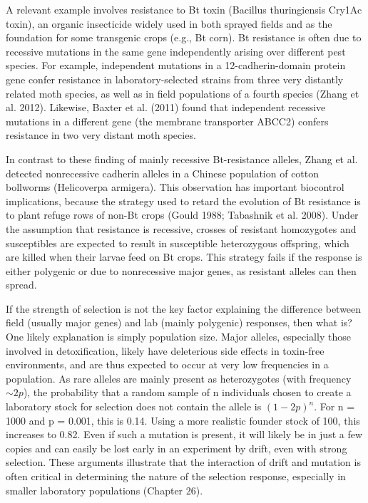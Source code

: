 \documentclass{article}
\begin{document}
A relevant example involves resistance to Bt toxin (Bacillus thuringiensis Cry1Ac toxin), an organic insecticide widely used in both sprayed fields and as the foundation for some transgenic crops (e.g., Bt corn). Bt resistance is often due to recessive mutations in the same gene independently arising over different pest species. For example, independent mutations in a 12-cadherin-domain protein gene confer resistance in laboratory-selected strains from three very distantly related moth species, as well as in field populations of a fourth species (Zhang et al. 2012). Likewise, Baxter et al. (2011) found that independent recessive mutations in a different gene (the membrane transporter ABCC2) confers resistance in two very distant moth species.

In contrast to these finding of mainly recessive Bt-resistance alleles, Zhang et al. detected nonrecessive cadherin alleles in a Chinese population of cotton bollworms (Helicoverpa armigera). This observation has important biocontrol implications, because the strategy used to retard the evolution of Bt resistance is to plant refuge rows of non-Bt crops (Gould 1988; Tabashnik et al. 2008). Under the assumption that resistance is recessive, crosses of resistant homozygotes and susceptibles are expected to result in susceptible heterozygous offspring, which are killed when their larvae feed on Bt crops. This strategy fails if the response is either polygenic or due to nonrecessive major genes, as resistant alleles can then spread.

If the strength of selection is not the key factor explaining the difference between field (usually major genes) and lab (mainly polygenic) responses, then what is? One likely explanation is simply population size. Major alleles, especially those involved in detoxification, likely have deleterious side effects in toxin-free environments, and are thus expected to occur at very low frequencies in a population. As rare alleles are mainly present as heterozygotes (with frequency  $ \sim2p $), the probability that a random sample of n individuals chosen to create a laboratory stock for selection does not contain the allele is  $ (1 - 2p)^n $. For n = 1000 and p = 0.001, this is 0.14. Using a more realistic founder stock of 100, this increases to 0.82. Even if such a mutation is present, it will likely be in just a few copies and can easily be lost early in an experiment by drift, even with strong selection. These arguments illustrate that the interaction of drift and mutation is often critical in determining the nature of the selection response, especially in smaller laboratory populations (Chapter 26).
\end{document}
